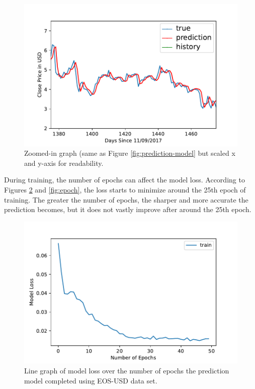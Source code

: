\begin{figure}[htb]
\includegraphics[width=\columnwidth]{images/EOS-USD-prediction-model-zoomed.pdf}

\caption{Zoomed-in graph (same as Figure \ref{fig:prediction-model} but scaled x and y-axis for readability.}
\label{fig:zoomed}
\end{figure}

During training, the number of epochs can affect the model loss. According to Figures \ref{fig:loss} and \ref{fig:epoch}, the loss starts to minimize around the 25th epoch of training. The greater the number of epochs, the sharper and more accurate the prediction becomes, but it does not vastly improve after around the 25th epoch.

\begin{figure}[htb]
\includegraphics[width=\columnwidth]{images/EOS-USD-training-loss.pdf}

\caption{Line graph of model loss over the number of epochs the prediction model completed using EOS-USD data set.}
\label{fig:loss}
\end{figure}

